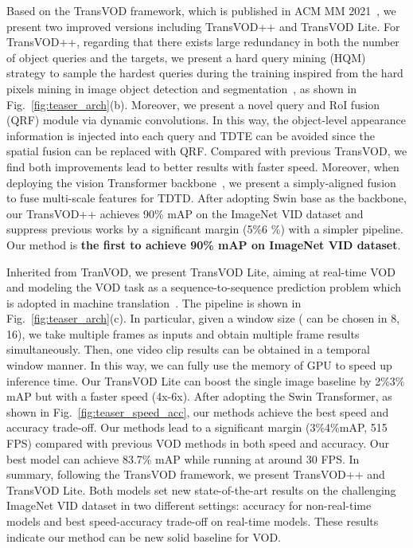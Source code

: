 \documentclass[10pt,journal,compsoc]{IEEEtran}
\begin{document}
Based on the TransVOD framework, which is published in ACM MM 2021~\cite{he2021end}, we present two improved versions including TransVOD++ and TransVOD Lite. For TransVOD++, regarding that 
there exists large redundancy in both the number of object queries and the targets, we present a hard query mining (HQM) strategy to sample the hardest queries during the training inspired from the hard pixels mining in image object detection and segmentation~\cite{FocalLoss,ohem,SegOHEM}, as shown in Fig.~\ref{fig:teaser_arch}(b). Moreover, we present a novel query and RoI fusion (QRF) module via dynamic convolutions. In this way, the object-level appearance information is injected into each query and TDTE can be avoided since the spatial fusion can be replaced with QRF. Compared with previous TransVOD, we find both improvements lead to better results with faster speed. Moreover, when deploying the vision Transformer backbone~\cite{liu2021swin}, we present a simply-aligned fusion to fuse multi-scale features for TDTD. After adopting Swin base as the backbone, our TransVOD++ achieves 90\% mAP on the ImageNet VID dataset and suppress previous works by a significant margin (5\%6 \%) with a simpler pipeline. Our method is \textbf{the first to achieve 90\% mAP on ImageNet VID dataset}.

Inherited from TranVOD, we present TransVOD Lite, aiming at real-time VOD and modeling the VOD task as a sequence-to-sequence prediction problem which is adopted in machine translation~\cite{Vaswani17attention}. The pipeline is shown in Fig.~\ref{fig:teaser_arch}(c). In particular, given a window size  ( can be chosen in {8, 16}), we take multiple frames as inputs and obtain multiple frame results simultaneously. Then, one video clip results can be obtained in a temporal window manner. In this way, we can fully use the memory of GPU to speed up inference time. Our TransVOD Lite can boost the single image baseline by 2\%3\% mAP but with a faster speed (4x-6x). After adopting the Swin Transformer, as shown in Fig.~\ref{fig:teaser_speed_acc}, our methods achieve the best speed and accuracy trade-off. Our methods lead to a significant margin (3\%4\%mAP, 515 FPS) compared with previous VOD methods in both speed and accuracy. Our best model can achieve 83.7\% mAP while running at around 30 FPS. In summary, following the TransVOD framework, we present TransVOD++ and TransVOD Lite. Both models set new state-of-the-art results on the challenging ImageNet VID dataset in two different settings: accuracy for non-real-time models and best speed-accuracy trade-off on real-time models. These results indicate our method can be new solid baseline for VOD.
\end{document}
